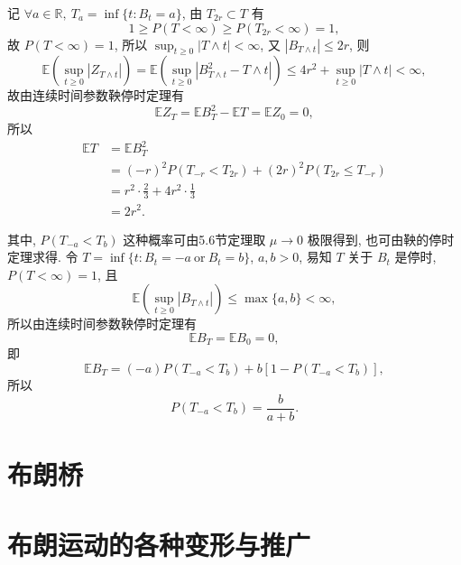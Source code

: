 \documentclass[openany]{ctexbook}
\theoremstyle{kaiti}
\theoremstyle{normal}
\begin{document}
记 $\forall a\in\mathbb{R},~T_a=\inf\{t:B_t=a\}$, 由 $T_{2r}\subset T$ 有
\begin{equation}
  1\geqslant P(T<\infty)\geqslant P(T_{2r}<\infty)=1,
\end{equation}
故 $P(T<\infty)=1$, 所以 $\sup_{t\geqslant0}|T\wedge t|<\infty$, 又 $|B_{T\wedge t}|\leqslant 2r$, 则
\begin{equation}
  \mathbb{E}\left(\sup_{t\geqslant0}|Z_{T\wedge t}|\right)=\mathbb{E}\left(\sup_{t\geqslant0}|B_{T\wedge t}^2-{T\wedge t}|\right)\leqslant 4r^2+\sup_{t\geqslant0}|T\wedge t|<\infty,
\end{equation}
故由连续时间参数鞅停时定理有
\begin{equation}
  \mathbb{E}Z_{T}=\mathbb{E}B_T^2-\mathbb{E}T=\mathbb{E}Z_0=0,
\end{equation}
所以
\begin{equation}
  \begin{aligned}
    \mathbb{E}T&=\mathbb{E}B_T^2\\
    &=(-r)^2P(T_{-r}<T_{2r})+(2r)^2P(T_{2r}\leqslant T_{-r})\\
    &=r^2\cdot\frac{2}{3}+4r^2\cdot\frac{1}{3}\\
    &=2r^2.
  \end{aligned}
\end{equation}

其中, $P(T_{-a}<T_{b})$ 这种概率可由5.6节定理取 $\mu\to0$ 极限得到, 也可由鞅的停时定理求得. 
令 $T=\inf\{t:B_t=-a~\text{or}~B_t=b\}$, $a,b>0$, 易知 $T$ 关于 $B_t$ 是停时, $P(T<\infty)=1$, 且
\begin{equation}
  \mathbb{E}\left(\sup_{t\geqslant0}|B_{T\wedge t}|\right)\leqslant \max\{a,b\}<\infty,
\end{equation}
所以由连续时间参数鞅停时定理有
\begin{equation}
  \mathbb{E}B_{T}=\mathbb{E}B_0=0,
\end{equation}
即
\begin{equation}
  \mathbb{E}B_T=(-a)P(T_{-a}<T_b)+b[1-P(T_{-a}<T_b)],
\end{equation}
所以
\begin{equation}
  P(T_{-a}<T_b)=\frac{b}{a+b}.
\end{equation}

\section{布朗桥}

\section{布朗运动的各种变形与推广}
\end{document}
